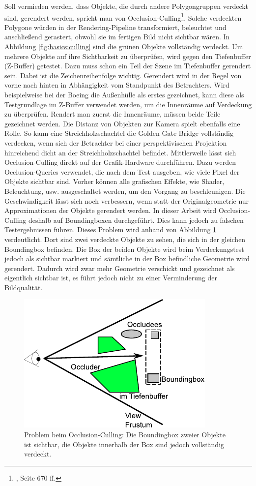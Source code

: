 Soll vermieden werden, dass Objekte, die durch andere Polygongruppen verdeckt sind, gerendert werden, spricht man von Occlusion-Culling\footnote{\cite{RTR3}, Seite 670 ff.}. Solche verdeckten Polygone würden in der Rendering-Pipeline transformiert, beleuchtet und anschließend gerastert, obwohl sie im fertigen Bild nicht sichtbar wären. In Abbildung \ref{fig:basics:culling} sind die grünen Objekte vollständig verdeckt. Um mehrere Objekte auf ihre Sichtbarkeit zu überprüfen, wird gegen den Tiefenbuffer (Z-Buffer) getestet. Dazu muss schon ein Teil der Szene im Tiefenbuffer gerendert sein. Dabei ist die Zeichenreihenfolge wichtig. Gerendert wird in der Regel von vorne nach hinten in Abhängigkeit vom Standpunkt des Betrachters. Wird beispielweise bei der Boeing die Außenhülle als erstes gezeichnet, kann diese als Testgrundlage im Z-Buffer verwendet werden, um die Innenräume auf Verdeckung zu überprüfen. Rendert man zuerst die Innenräume, müssen beide Teile gezeichnet werden. Die Distanz von Objekten zur Kamera spielt ebenfalls eine Rolle. So kann eine Streichholzschachtel die Golden Gate Bridge vollständig verdecken, wenn sich der Betrachter bei einer perspektivischen Projektion hinreichend dicht an der Streichholzschachtel befindet. Mittlerweile lässt sich Occlusion-Culling direkt auf der Grafik-Hardware durchführen. Dazu werden Occlusion-Queries verwendet, die nach dem Test ausgeben, wie viele Pixel der Objekte sichtbar sind. Vorher können alle grafischen Effekte, wie Shader, Beleuchtung, usw. ausgeschaltet werden, um den Vorgang zu beschleunigen. Die Geschwindigkeit lässt sich noch verbessern, wenn statt der Originalgeometrie nur Approximationen der Objekte gerendert werden. In dieser Arbeit wird Occlusion-Culling deshalb auf Boundingboxen durchgeführt. Dies kann jedoch zu falschen Testergebnissen führen. Dieses Problem wird anhand von Abbildung \ref{fig:basics:oculling} verdeutlicht. Dort sind zwei verdeckte Objekte zu sehen, die sich in der gleichen Boundingbox befinden. Die Box der beiden Objekte wird beim Verdeckungstest jedoch als sichtbar markiert und sämtliche in der Box befindliche Geometrie wird gerendert. Dadurch wird zwar mehr Geometrie verschickt und gezeichnet als eigentlich sichtbar ist, es führt jedoch nicht zu einer Verminderung der Bildqualität.
\begin{figure}
  \centering
  \includegraphics[scale=0.8]{images/oculling.pdf}
  \caption{\label{fig:basics:oculling}Problem beim Occlusion-Culling: Die Boundingbox zweier Objekte ist sichtbar, die Objekte innerhalb der Box sind jedoch vollständig verdeckt.}
\end{figure}

